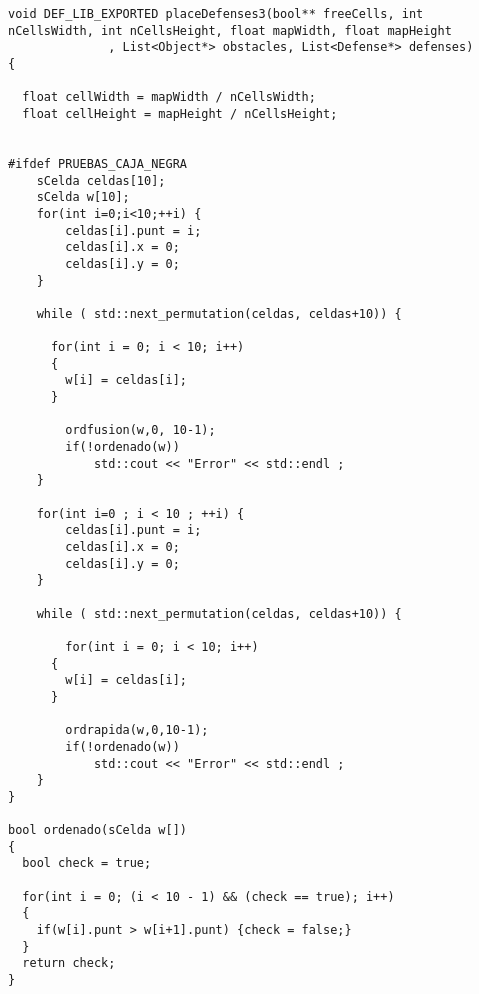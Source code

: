 
\begin{lstlisting}
void DEF_LIB_EXPORTED placeDefenses3(bool** freeCells, int nCellsWidth, int nCellsHeight, float mapWidth, float mapHeight
              , List<Object*> obstacles, List<Defense*> defenses) 
{

  float cellWidth = mapWidth / nCellsWidth;
  float cellHeight = mapHeight / nCellsHeight; 


#ifdef PRUEBAS_CAJA_NEGRA
    sCelda celdas[10];
    sCelda w[10];
    for(int i=0;i<10;++i) {
        celdas[i].punt = i;
        celdas[i].x = 0;
        celdas[i].y = 0;
    }
    
    while ( std::next_permutation(celdas, celdas+10)) {
      
      for(int i = 0; i < 10; i++)
      {
        w[i] = celdas[i];
      }
      
        ordfusion(w,0, 10-1);
        if(!ordenado(w))
            std::cout << "Error" << std::endl ;
    }
  
    for(int i=0 ; i < 10 ; ++i) {
        celdas[i].punt = i;
        celdas[i].x = 0;
        celdas[i].y = 0;
    }
    
    while ( std::next_permutation(celdas, celdas+10)) {
    
        for(int i = 0; i < 10; i++)
      {
        w[i] = celdas[i];
      }
      
        ordrapida(w,0,10-1);
        if(!ordenado(w)) 
            std::cout << "Error" << std::endl ;
    }
}

bool ordenado(sCelda w[])
{
  bool check = true;
  
  for(int i = 0; (i < 10 - 1) && (check == true); i++)
  {
    if(w[i].punt > w[i+1].punt) {check = false;}
  }
  return check;
}

\end{lstlisting}
